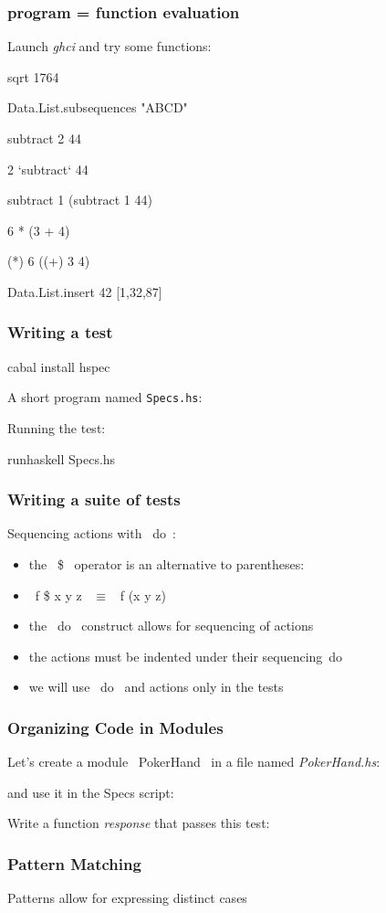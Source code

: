 \documentclass[11pt,xcolor={dvipsnames}]{beamer}
\newcommand{\tc}{\textcolor}
\newcommand{\key}[1]{\tc{orange}{#1}}
\newcommand{\rk}{\enskip{\key{$\hookleftarrow$}}}
\newcommand{\vs}{\vspace{1em}}
\newcommand{\lstH}[1]{}
\newcommand{\lstT}[1]{}
\begin{document}
\begin{frame}[fragile]
\frametitle{program = function evaluation}
Launch \emph{ghci} and try some functions:
\begin{term}
sqrt 1764\rk

Data.List.subsequences "ABCD"\rk

subtract 2 44\rk

 2 `subtract` 44\rk

subtract 1 (subtract 1 44)\rk

6 * (3 + 4)\rk

(*) 6 ((+) 3 4)\rk

Data.List.insert 42 [1,32,87]\rk
\end{term}
\end{frame}
\begin{frame}[fragile]
\frametitle{Writing a test}

\begin{term}
cabal install hspec\rk
\end{term}
A short program named \texttt{Specs.hs}:
\lstT{005}
\vs
Running the test:
\begin{term}
runhaskell Specs.hs\rk
\end{term}
\end{frame}
\begin{frame}[fragile]
\frametitle{Writing a suite of tests}
Sequencing actions with ~do~:
\lstT{006}
\begin{itemize}
\item the ~\$~ operator is an alternative to parentheses:
\item ~f \$ x y z~ $\equiv$ ~f (x y z)~
\item the ~do~ construct allows for sequencing of actions
\item the actions must be indented under their sequencing~do~ 
\item we will use ~do~ and actions only in the tests
\end{itemize}
\end{frame}
\begin{frame}[fragile]
\frametitle{Organizing Code in Modules}
Let's create a module ~PokerHand~ in a file named \emph{PokerHand.hs}:
\lstH{029a}
and use it in the Specs script:
\lstT{029b}
Write a function \emph{response} that passes this test:
\lstT{007}
\end{frame}
\begin{frame}[fragile]
\frametitle{Pattern Matching}
\lstH{008}
\vs
Patterns allow for expressing distinct cases 
\end{frame}
\end{document}

